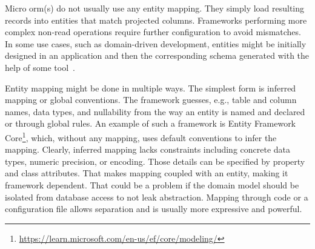 Micro \acrshort{orm}(s) do not usually use any entity mapping. They simply load resulting records into entities that match projected columns. Frameworks performing more complex non-read operations require further configuration to avoid mismatches. In some use cases, such as domain-driven development, entities might be initially designed in an application and then the corresponding schema generated with the help of some tool~\cite{FowlerDDD}.

Entity mapping might be done in multiple ways. The simplest form is inferred mapping or global conventions. The framework guesses, e.g., table and column names, data types, and nullability from the way an entity is named and declared or through global rules. An example of such a framework is Entity Framework Core\footnote{\url{https://learn.microsoft.com/en-us/ef/core/modeling/}}, which, without any mapping, uses default conventions to infer the mapping. Clearly, inferred mapping lacks constraints including concrete data types, numeric precision, or encoding. Those details can be specified by property and class attributes. That makes mapping coupled with an entity, making it framework dependent. That could be a problem if the domain model should be isolated from database access to not leak abstraction. Mapping through code or a configuration file allows separation and is usually more expressive and powerful.

